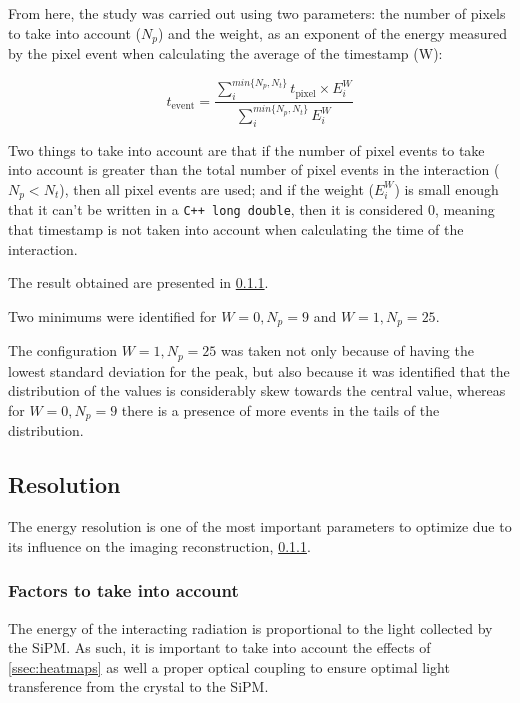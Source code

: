 From here, the study was carried out using two parameters: the number of pixels to take into account ($N_p$) and the weight, as an exponent of the energy measured by the pixel event when calculating the average of the timestamp (W):

\begin{equation}
    t_\text{event}=\frac{\sum_{i}^{min\{N_p,N_t\}}t_\text{pixel}\times E_i^W}{\sum_{i}^{min\{N_p,N_t\}}E_i^W}
\end{equation}

Two things to take into account are that if the number of pixel events to take into account is greater than the total number of pixel events in the interaction ($N_p<N_t$), then all pixel events are used; and if the weight ($E_i^W$) is small enough that it can't be written in a \texttt{C++ long double}, then it is considered 0, meaning that timestamp is not taken into account when calculating the time of the interaction.

The result obtained are presented in \ref{}.

Two minimums were identified for $W=0, N_p=9$ and $W=1, N_p=25$.

The configuration $W=1, N_p=25$ was taken not only because of having the lowest standard deviation for the peak, but also because it was identified that the distribution of the values is considerably skew towards the central value, whereas for $W=0, N_p=9$ there is a presence of more events in the tails of the distribution.

\subsection{Resolution}\label{ssec:resolution}

The energy resolution is one of the most important parameters to optimize due to its influence on the imaging reconstruction, \ref{}.

\subsubsection{Factors to take into account}

The energy of the interacting radiation is proportional to the light collected by the \ac{SiPM}. As such, it is important to take into account the effects of \ref{ssec:heatmaps} as well a proper optical coupling to ensure optimal light transference from the crystal to the \ac{SiPM}.

